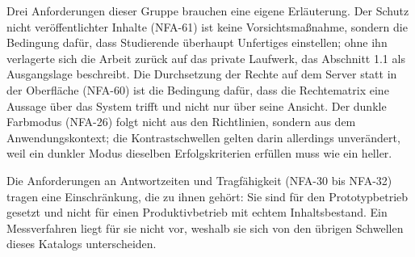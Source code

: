 Drei Anforderungen dieser Gruppe brauchen eine eigene Erläuterung. Der Schutz nicht veröffentlichter Inhalte (NFA-61) ist keine Vorsichtsmaßnahme, sondern die Bedingung dafür, dass Studierende überhaupt Unfertiges einstellen; ohne ihn verlagerte sich die Arbeit zurück auf das private Laufwerk, das Abschnitt 1.1 als Ausgangslage beschreibt. Die Durchsetzung der Rechte auf dem Server statt in der Oberfläche (NFA-60) ist die Bedingung dafür, dass die Rechtematrix eine Aussage über das System trifft und nicht nur über seine Ansicht. Der dunkle Farbmodus (NFA-26) folgt nicht aus den Richtlinien, sondern aus dem Anwendungskontext; die Kontrastschwellen gelten darin allerdings unverändert, weil ein dunkler Modus dieselben Erfolgskriterien erfüllen muss wie ein heller.

Die Anforderungen an Antwortzeiten und Tragfähigkeit (NFA-30 bis NFA-32) tragen eine Einschränkung, die zu ihnen gehört: Sie sind für den Prototypbetrieb gesetzt und nicht für einen Produktivbetrieb mit echtem Inhaltsbestand. Ein Messverfahren liegt für sie nicht vor, weshalb sie sich von den übrigen Schwellen dieses Katalogs unterscheiden.

